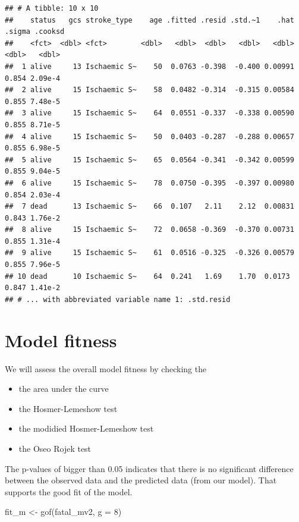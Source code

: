 \documentclass[
  10pt,
]{krantz}
\newenvironment{Shaded}{\begin{snugshade}}{\end{snugshade}}
\newcommand{\AttributeTok}[1]{\textcolor[rgb]{0.77,0.63,0.00}{#1}}
\newcommand{\DecValTok}[1]{\textcolor[rgb]{0.00,0.00,0.81}{#1}}
\newcommand{\FunctionTok}[1]{\textcolor[rgb]{0.00,0.00,0.00}{#1}}
\newcommand{\NormalTok}[1]{#1}
\newcommand{\OtherTok}[1]{\textcolor[rgb]{0.56,0.35,0.01}{#1}}
\providecommand{\tightlist}{%
  \setlength{\itemsep}{0pt}\setlength{\parskip}{0pt}}
\begin{document}
\begin{verbatim}
## # A tibble: 10 x 10
##    status   gcs stroke_type    age .fitted .resid .std.~1    .hat .sigma .cooksd
##    <fct>  <dbl> <fct>        <dbl>   <dbl>  <dbl>   <dbl>   <dbl>  <dbl>   <dbl>
##  1 alive     13 Ischaemic S~    50  0.0763 -0.398  -0.400 0.00991  0.854 2.09e-4
##  2 alive     15 Ischaemic S~    58  0.0482 -0.314  -0.315 0.00584  0.855 7.48e-5
##  3 alive     15 Ischaemic S~    64  0.0551 -0.337  -0.338 0.00590  0.855 8.71e-5
##  4 alive     15 Ischaemic S~    50  0.0403 -0.287  -0.288 0.00657  0.855 6.98e-5
##  5 alive     15 Ischaemic S~    65  0.0564 -0.341  -0.342 0.00599  0.855 9.04e-5
##  6 alive     15 Ischaemic S~    78  0.0750 -0.395  -0.397 0.00980  0.854 2.03e-4
##  7 dead      13 Ischaemic S~    66  0.107   2.11    2.12  0.00831  0.843 1.76e-2
##  8 alive     15 Ischaemic S~    72  0.0658 -0.369  -0.370 0.00731  0.855 1.31e-4
##  9 alive     15 Ischaemic S~    61  0.0516 -0.325  -0.326 0.00579  0.855 7.96e-5
## 10 dead      10 Ischaemic S~    64  0.241   1.69    1.70  0.0173   0.847 1.41e-2
## # ... with abbreviated variable name 1: .std.resid
\end{verbatim}

\hypertarget{model-fitness}{%
\section{\texorpdfstring{Model fitness}{Model fitness}}\label{model-fitness}}

We will assess the overall model fitness by checking the

\begin{itemize}
\tightlist
\item
  the area under the curve
\item
  the Hosmer-Lemeshow test
\item
  the modidied Hosmer-Lemeshow test
\item
  the Oseo Rojek test
\end{itemize}

The p-values of bigger than 0.05 indicates that there is no significant difference between the observed data and the predicted data (from our model). That supports the good fit of the model.

\begin{Shaded}
\begin{Highlighting}[]
\NormalTok{fit\_m }\OtherTok{\textless{}{-}} \FunctionTok{gof}\NormalTok{(fatal\_mv2, }
             \AttributeTok{g =} \DecValTok{8}\NormalTok{)}
\end{Highlighting}
\end{Shaded}
\end{document}
